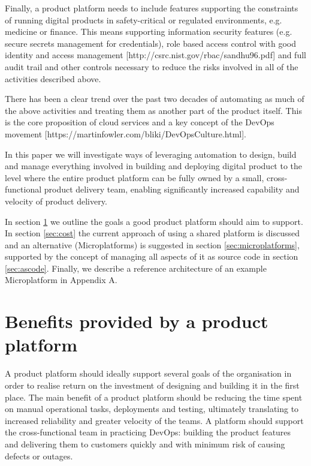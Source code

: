 \documentclass[reprint,amsmath,amssymb,aps]{revtex4-1}
\begin{document}
Finally, a product platform needs to include features supporting the constraints of running digital products in safety-critical or regulated environments, e.g. medicine or finance. This means supporting information security features (e.g. secure secrets management for credentials), role based access control with good identity and access management [http://csrc.nist.gov/rbac/sandhu96.pdf] and full audit trail and other controls necessary to reduce the risks involved in all of the activities described above.

There has been a clear trend over the past two decades of automating as much of the above activities and treating them as another part of the product itself. This is the core proposition of cloud services and a key concept of the DevOps movement [https://martinfowler.com/bliki/DevOpsCulture.html].

In this paper we will investigate ways of leveraging automation to design, build and manage everything involved in building and deploying digital product to the level where the entire product platform can be fully owned by a small, cross-functional product delivery team, enabling significantly increased capability and velocity of product delivery. 

In section \ref{sec:benefits} we outline the goals a good product platform should aim to support. In section \ref{sec:cost} the current approach of using a shared platform is discussed and an alternative (Microplatforms) is suggested in section \ref{sec:microplatforms}, supported by the concept of managing all aspects of it as source code in section \ref{sec:ascode}. Finally, we describe a reference architecture of an example Microplatform in Appendix A.


\section{Benefits provided by a product platform}
\label{sec:benefits}

A product platform should ideally support several goals of the organisation in order to realise return on the investment of designing and building it in the first place. The main benefit of a product platform should be reducing the time spent on manual operational tasks, deployments and testing, ultimately translating to increased reliability and greater velocity of the teams. A platform should support the cross-functional team in practicing DevOps: building the product features and delivering them to customers quickly and with minimum risk of causing defects or outages.
\end{document}
